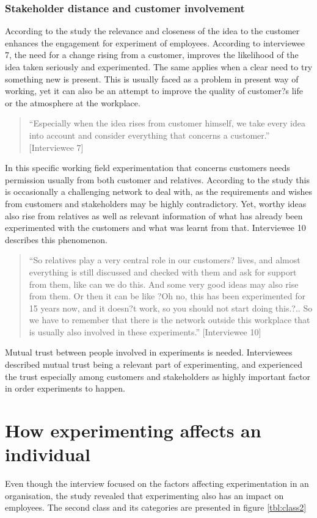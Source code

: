 \subsubsection{Stakeholder distance and customer involvement}
According to the study the relevance and closeness of the idea to the customer enhances the engagement for experiment of employees. According to interviewee 7, the need for a change rising from a customer, improves the likelihood of the idea taken seriously and experimented. The same applies when a clear need to try something new is present. This is usually faced as a problem in present way of working, yet it can also be an attempt to improve the quality of customer?s life or the atmosphere at the workplace.  
\begin{quote}
 ``Especially when the idea rises from customer himself, we take every idea into account and consider everything that concerns a customer.'' [Interviewee 7]
\end{quote}
In this specific working field experimentation that concerns customers needs permission usually from both customer and relatives. According to the study this is occasionally a challenging network to deal with, as the requirements and wishes from customers and stakeholders may be highly contradictory. Yet, worthy ideas also rise from relatives as well as relevant information of what has already been experimented with the customers and what was learnt from that. Interviewee 10 describes this phenomenon. 
\begin{quote}
``So relatives play a very central role in our customers? lives, and almost everything is still discussed and checked with them and ask for support from them, like can we do this. And some very good ideas may also rise from them. Or then it can be like ?Oh no, this has been experimented for 15 years now, and it doesn?t work, so you should not start doing this.?.. So we have to remember that there is the network outside this workplace that is usually also involved in these experiments.'' [Interviewee 10]
\end{quote}
Mutual trust between people involved in experiments is needed. Interviewees described mutual trust being a relevant part of experimenting, and experienced the trust especially among customers and stakeholders as highly important factor in order experiments to happen. 

\section{How experimenting affects an individual}
Even though the interview focused on the factors affecting experimentation in an organisation, the study revealed that experimenting also has an impact on employees. The second class and its categories are presented in figure \ref{tbl:class2}

